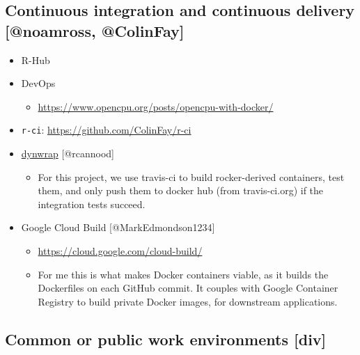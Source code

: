 \hypertarget{continuous-integration-and-continuous-delivery-colinfaynoamross-colinfay}{%
\subsection{\texorpdfstring{Continuous integration and continuous
delivery {[}@noamross,
@ColinFay{]}}{Continuous integration and continuous delivery , @ColinFay{[}@noamross, @ColinFay{]}}}\label{continuous-integration-and-continuous-delivery-colinfaynoamross-colinfay}}

\begin{itemize}
\tightlist
\item
  R-Hub
\item
  DevOps

  \begin{itemize}
  \tightlist
  \item
    \url{https://www.opencpu.org/posts/opencpu-with-docker/}
  \end{itemize}
\item
  \texttt{r-ci}: \url{https://github.com/ColinFay/r-ci}
\item
  \href{https://github.com/dynverse/dynwrap_containers/blob/master/.travis.yml}{dynwrap}
  {[}@rcannood{]}

  \begin{itemize}
  \tightlist
  \item
    For this project, we use travis-ci to build rocker-derived
    containers, test them, and only push them to docker hub (from
    travis-ci.org) if the integration tests succeed.
  \end{itemize}
\item
  Google Cloud Build {[}@MarkEdmondson1234{]}

  \begin{itemize}
  \tightlist
  \item
    \url{https://cloud.google.com/cloud-build/}
  \item
    For me this is what makes Docker containers viable, as it builds the
    Dockerfiles on each GitHub commit. It couples with Google Container
    Registry to build private Docker images, for downstream
    applications.
  \end{itemize}
\end{itemize}

\hypertarget{common-or-public-work-environments-div}{%
\subsection{Common or public work environments
{[}div{]}}\label{common-or-public-work-environments-div}}

